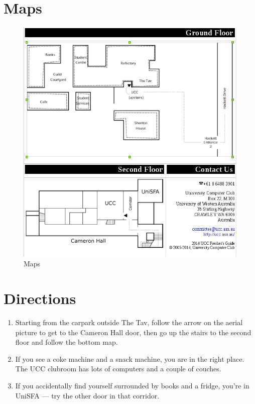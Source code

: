 \label{FindClubroom}



\section{Maps}


\begin{figure}[H]
	\centering
	\includegraphics[width=1\textwidth]{figures/maps.png}
	\caption{Maps} 
	\label{maps.png}
\end{figure}

\pagebreak


\section{Directions}

\begin{enumerate}
	\item Starting from the carpark outside The Tav, follow the arrow on the aerial picture to get to the Cameron Hall door, then go up the stairs to the second floor and follow the bottom map.
	\item If you see a coke machine and a snack machine, you are in the right place. The UCC clubroom has lots of computers and a couple of couches.
	\item If you accidentally find yourself surrounded by books and a fridge, you're in UniSFA --- try the other door in that corridor.
\end{enumerate}

